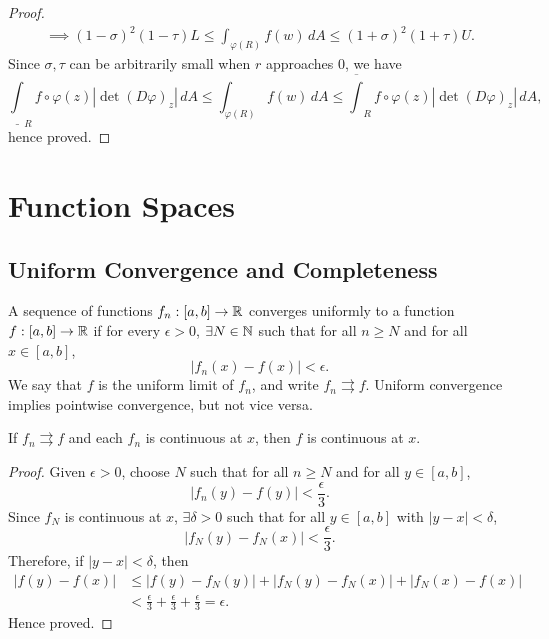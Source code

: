 \begin{thm}
\begin{proof}
\begin{gather*}
            \implies (1 - \sigma)^2 (1 - \tau) L \leq \int_{\varphi(R)} f(w) \, dA \leq (1 + \sigma)^2 (1 + \tau) U.
        \end{gather*}
        Since $\sigma, \tau$ can be arbitrarily small when $r$ approaches $0$, we have
        \[
        \underline{\int}_R f \circ \varphi(z) |\det (D\varphi)_z| \, dA \leq \int_{\varphi(R)} f(w) \, dA \leq \overline{\int}_R f \circ \varphi(z) |\det (D\varphi)_z| \, dA,
        \]
        hence proved.
    \end{proof}
\end{thm}

\chapter{Function Spaces}

\section{Uniform Convergence and Completeness}

A sequence of functions $f_n: [a, b] \to {\mathbb R}$ converges uniformly to a function $f: [a, b] \to {\mathbb R}$ if for every $\epsilon > 0$, $\exists N \in {\mathbb N}$ such that for all $n \geq N$ and for all $x \in [a, b]$,
\[
|f_n(x) - f(x)| < \epsilon.
\]
We say that $f$ is the uniform limit of $f_n$, and write $f_n \rightrightarrows f$. Uniform convergence implies pointwise convergence, but not vice versa.

\begin{prop}
    \label{prop:uniform_limit_continuous}
    If $f_n \rightrightarrows f$ and each $f_n$ is continuous at $x$, then $f$ is continuous at $x$.
    \begin{proof}
        Given $\epsilon > 0$, choose $N$ such that for all $n \geq N$ and for all $y \in [a, b]$,
        \[
        |f_n(y) - f(y)| < \frac{\epsilon}{3}.
        \]
        Since $f_N$ is continuous at $x$, $\exists \delta > 0$ such that for all $y \in [a, b]$ with $|y - x| < \delta$,
        \[
        |f_N(y) - f_N(x)| < \frac{\epsilon}{3}.
        \]
        Therefore, if $|y - x| < \delta$, then
        \begin{align*}
            |f(y) - f(x)| &\leq |f(y) - f_N(y)| + |f_N(y) - f_N(x)| + |f_N(x) - f(x)| \\
            &< \frac{\epsilon}{3} + \frac{\epsilon}{3} + \frac{\epsilon}{3} = \epsilon.
        \end{align*}
        Hence proved.
    \end{proof}
\end{prop}

